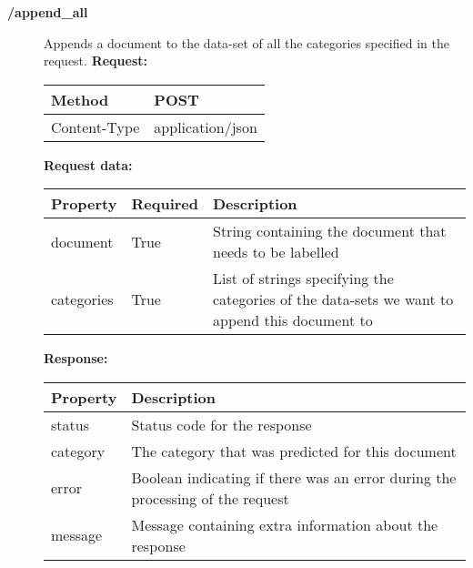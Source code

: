 \begin{description}
\item[\textbf{/append\_all}]
Appends a document to the data-set of all the categories specified in the request.
\newline
\newline
\textbf{Request:}
\newline
\newline
\begin{tabular}{ | l | l |}
\hline
Method & POST\\ \hline
Content-Type & application/json\\ \hline
\end{tabular}
\newline
\newline
\textbf{Request data:}
\newline
\newline
\resizebox{\textwidth}{!} {
\begin{tabular}{ | l | l | l |}
\hline
\textbf{Property} & \textbf{Required} & \textbf{Description}\\ \hline
document & True & String containing the document that needs to be labelled\\ \hline
categories & True & List of strings specifying the categories of the data-sets we want to append this document to\\ \hline
\end{tabular}}
\newline
\newline
\textbf{Response:}
\newline
\newline
\resizebox{\textwidth}{!} {
\begin{tabular}{ | l | l |}
\hline
\textbf{Property} & \textbf{Description}\\ \hline
status & Status code for the response\\ \hline
category & The category that was predicted for this document\\ \hline
error & Boolean indicating if there was an error during the processing of the request\\ \hline
message & Message containing extra information about the response\\ \hline
\end{tabular}}


\end{description}
